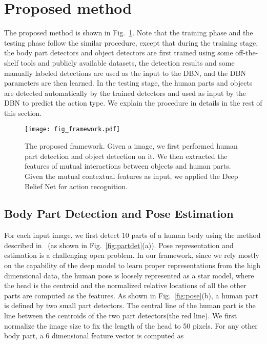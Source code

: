 \documentclass{article}
\begin{document}
\section{Proposed method}

The proposed method is shown in Fig.~\ref{fig:framework}.  Note that the training phase and the testing phase follow the similar procedure, except that during the training stage, the body part detectors and object detectors are first trained using some off-the-shelf tools and publicly available datasets, the detection results and some manually labeled detections are used as the input to the DBN, and the DBN parameters are then learned.  In the testing stage, the human parts and objects are detected automatically by the trained detectors and used as input by the DBN to predict the action type.  We explain the procedure in details in the rest of this section.

\begin{figure}[htpb]
\centering
\texttt{[image: fig\_framework.pdf]}
\vspace{-8mm}
\caption{The proposed framework. Given a image, we first performed human part detection and object detection on it.  We then extracted the features of mutual interactions between objects and human parts. Given the mutual contextual features as input, we applied the Deep Belief Net for action recognition.}
\label{fig:framework}
\end{figure}

\subsection{Body Part Detection and Pose Estimation}

For each input image, we first detect 10 parts of a human body using the method described in~\cite{XuReID13} (as shown in Fig.~\ref{fig:partdet}(a)).  Pose representation and estimation is a challenging open problem.  In our framework, since we rely mostly on the capability of the deep model to learn proper representations from the high dimensional data, the human pose is loosely represented as a star model, where the head is the centroid and the normalized relative locations of all the other parts are computed as the features.  As shown in Fig.~\ref{fig:pose}(b), a human part is defined by two small part detectors.  The central line of the human part is the line between the centroids of the two part detectors(the red line).  We first normalize the image size to fix the length of the head to 50 pixels.  For any other body part, a 6 dimensional feature vector is computed as
\end{document}
